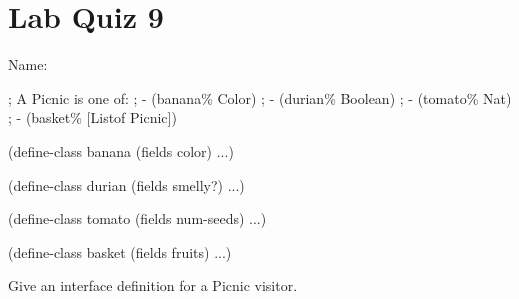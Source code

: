 \documentclass{article}
\begin{document}
\section*{Lab Quiz 9}

\bigskip
\bigskip
Name: \underline{\hspace*{4in}}

\bigskip
\setlength{\parskip}{8pt}

\begin{schemedisplay}
  ; A Picnic is one of:
  ;  - (banana\% Color)
  ;  - (durian\% Boolean)
  ;  - (tomato\% Nat)
  ;  - (basket\% [Listof Picnic])

  (define-class banana%
    (fields color)
    ...)

  (define-class durian%
    (fields smelly?)
    ...)

  (define-class tomato%
    (fields num-seeds)
    ...)

  (define-class basket%
    (fields fruits)
    ...)
\end{schemedisplay}

\bigskip

Give an interface definition for a Picnic visitor.
\end{document}

